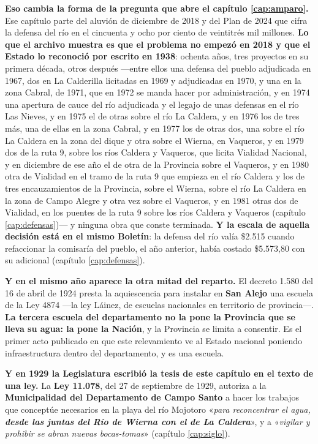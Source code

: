 \begin{cautela}
\begin{cautela}
\textbf{Eso cambia la forma de la pregunta que abre el capítulo \ref{cap:amparo}.} Ese capítulo
parte del aluvión de diciembre de 2018 y del Plan de 2024 que cifra la defensa del río en el
cincuenta y ocho por ciento de veintitrés mil millones. \textbf{Lo que el archivo muestra es que
el problema no empezó en 2018 y que el Estado lo reconoció por escrito en 1938}: ochenta años,
tres proyectos en su primera década, otros después ---entre ellos una defensa del pueblo adjudicada en 1967, dos en La Calderilla licitadas en 1969 y adjudicadas en 1970, y una en la zona Cabral, de 1971, que en 1972 se manda hacer por administración, y en 1974 una apertura de cauce del río adjudicada y el legajo de unas defensas en el río Las Nieves, y en 1975 el de otras sobre el río La Caldera, y en 1976 los de tres más, una de ellas en la zona Cabral, y en 1977 los de otras dos, una sobre el río La Caldera en la zona del dique y otra sobre el Wierna, en Vaqueros, y en 1979 dos de la ruta 9, sobre los ríos Caldera y Vaqueros, que licita Vialidad Nacional, y en diciembre de ese año el de otra de la Provincia sobre el Vaqueros, y en 1980 otra de Vialidad en el tramo de la ruta 9 que empieza en el río Caldera y los de tres encauzamientos de la Provincia, sobre el Wierna, sobre el río La Caldera en la zona de Campo Alegre y otra vez sobre el Vaqueros, y en 1981 otras dos de Vialidad, en los puentes de la ruta 9 sobre los ríos Caldera y Vaqueros (capítulo \ref{cap:defensas})--- y ninguna obra que conste terminada. \textbf{Y la escala de aquella decisión está
en el mismo Boletín}: la defensa del río valía \$2.515 cuando refaccionar la comisaría del
pueblo, el año anterior, había costado \$5.573,80 con su adicional (capítulo \ref{cap:defensas}).
\end{cautela}

\textbf{Y en el mismo año aparece la otra mitad del reparto.} El decreto 1.580 del 16 de abril de
1924 presta la aquiescencia para instalar en \textbf{San Alejo} una escuela de la Ley 4874 ---la
ley Láinez, de escuelas nacionales en territorio de provincia---. \textbf{La tercera escuela del
departamento no la pone la Provincia que se lleva su agua: la pone la Nación}, y la Provincia se
limita a consentir. Es el primer acto publicado en que este relevamiento ve al Estado nacional poniendo
infraestructura dentro del departamento, y es una escuela.

\begin{cautela}
\textbf{Y en 1929 la Legislatura escribió la tesis de este capítulo en el texto de una ley.} La
\textbf{Ley 11.078}, del 27 de septiembre de 1929, autoriza a la \textbf{Municipalidad del
Departamento de Campo Santo} a hacer los trabajos que conceptúe necesarios en la playa del río
Mojotoro «\textit{para reconcentrar el agua, \textbf{desde las juntas del Río de Wierna con el de
La Caldera}}», y a «\textit{vigilar y prohibir se abran nuevas bocas-tomas}» (capítulo
\ref{cap:siglo}).


\end{cautela}
\end{cautela}
